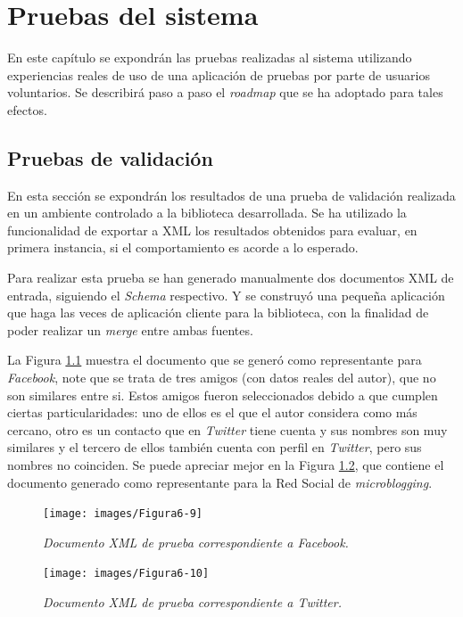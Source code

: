 \chapter{Pruebas del sistema}

En este capítulo se expondrán las pruebas realizadas al sistema utilizando experiencias reales de uso de una aplicación de pruebas por parte de usuarios voluntarios. Se describirá paso a paso el \textit{roadmap} que se ha adoptado para tales efectos.

\section{Pruebas de validación}

En esta sección se expondrán los resultados de una prueba de validación realizada en un ambiente controlado a la biblioteca desarrollada. Se ha utilizado la funcionalidad de exportar a XML los resultados obtenidos para evaluar, en primera instancia, si el comportamiento es acorde a lo esperado.

Para realizar esta prueba se han generado manualmente dos documentos XML de entrada, siguiendo el \textit{Schema} respectivo. Y se construyó una pequeña aplicación que haga las veces de aplicación cliente para la biblioteca, con la finalidad de poder realizar un \textit{merge} entre ambas fuentes.

La Figura \ref{fig:ps-im9} muestra el documento que se generó como representante para \textit{Facebook}, note que se trata de tres amigos (con datos reales del autor), que no son similares entre si. Estos amigos fueron seleccionados debido a que cumplen ciertas particularidades: uno de ellos es el que el autor considera como más cercano, otro es un contacto que en \textit{Twitter} tiene cuenta y sus nombres son muy similares y el tercero de ellos también cuenta con perfil en \textit{Twitter}, pero sus nombres no coinciden. Se puede apreciar mejor en la Figura \ref{fig:ps-im10}, que contiene el documento generado como representante para la Red Social de \textit{microblogging}.

\begin{figure}[H]
	\centering
	\texttt{[image: images/Figura6-9]}
	\caption{\em Documento XML de prueba correspondiente a Facebook.}
	\label{fig:ps-im9}
\end{figure}

\begin{figure}[H]
	\centering
	\texttt{[image: images/Figura6-10]}
	\caption{\em Documento XML de prueba correspondiente a Twitter.}
	\label{fig:ps-im10}
\end{figure}

